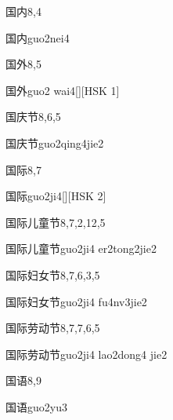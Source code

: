\begin{entry}{国内}{8,4}
  \begin{phonetics}{国内}{guo2nei4}
  \end{phonetics}
\end{entry}

\begin{entry}{国外}{8,5}
  \begin{phonetics}{国外}{guo2 wai4}[][HSK 1]
  \end{phonetics}
\end{entry}

\begin{entry}{国庆节}{8,6,5}
  \begin{phonetics}{国庆节}{guo2qing4jie2}
  \end{phonetics}
\end{entry}

\begin{entry}{国际}{8,7}
  \begin{phonetics}{国际}{guo2ji4}[][HSK 2]
  \end{phonetics}
\end{entry}

\begin{entry}{国际儿童节}{8,7,2,12,5}
  \begin{phonetics}{国际儿童节}{guo2ji4 er2tong2jie2}
  \end{phonetics}
\end{entry}

\begin{entry}{国际妇女节}{8,7,6,3,5}
  \begin{phonetics}{国际妇女节}{guo2ji4 fu4nv3jie2}
  \end{phonetics}
\end{entry}

\begin{entry}{国际劳动节}{8,7,7,6,5}
  \begin{phonetics}{国际劳动节}{guo2ji4 lao2dong4 jie2}
  \end{phonetics}
\end{entry}

\begin{entry}{国语}{8,9}
  \begin{phonetics}{国语}{guo2yu3}
  \end{phonetics}
\end{entry}

